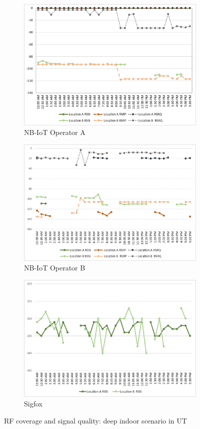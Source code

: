 \documentclass[12pt]{article}
\begin{document}
 \begin{figure}[h!]
\begin{subfigure}[t]{\linewidth}
  \centering
  \includegraphics[width=.5\linewidth]{Images/tartu/ATartuDeepIndoor.pdf}  
  \caption{NB-IoT Operator A}
\end{subfigure}
\begin{subfigure}[t]{\linewidth}
  \centering
  \includegraphics[width=.5\linewidth]{Images/tartu/BTartuDeepIndoor.pdf}  
  \caption{NB-IoT Operator B}
  
\end{subfigure}
\begin{subfigure}[t]{\linewidth}
  \centering
  \includegraphics[width=.5\linewidth]{Images/tartu/STartuDeepIndoor.pdf}  
\caption{Sigfox}
 \end{subfigure}
\caption{RF coverage and signal quality: deep indoor scenario in UT}
 \label{RFDeepIndoorTartu}
\end{figure}
\end{document}
